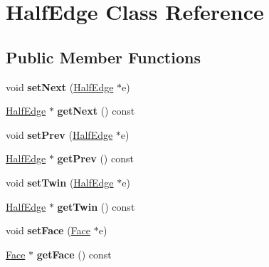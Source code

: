 \hypertarget{class_half_edge}{}\section{Half\+Edge Class Reference}
\label{class_half_edge}
\subsection*{Public Member Functions}
\begin{DoxyCompactItemize}
\item 
\hypertarget{class_half_edge_a7d2060b0e023b7c2d807703698289464}{}void {\bfseries set\+Next} (\hyperlink{class_half_edge}{Half\+Edge} $\ast$e)\label{class_half_edge_a7d2060b0e023b7c2d807703698289464}

\item 
\hypertarget{class_half_edge_a524f79fe9f7de1b472d558ad6d11bbbe}{}\hyperlink{class_half_edge}{Half\+Edge} $\ast$ {\bfseries get\+Next} () const \label{class_half_edge_a524f79fe9f7de1b472d558ad6d11bbbe}

\item 
\hypertarget{class_half_edge_a3ffffd914af607d780afbcad9ef2eb55}{}void {\bfseries set\+Prev} (\hyperlink{class_half_edge}{Half\+Edge} $\ast$e)\label{class_half_edge_a3ffffd914af607d780afbcad9ef2eb55}

\item 
\hypertarget{class_half_edge_a7677b9fc7b34b0e3dfd5bd58531cd239}{}\hyperlink{class_half_edge}{Half\+Edge} $\ast$ {\bfseries get\+Prev} () const \label{class_half_edge_a7677b9fc7b34b0e3dfd5bd58531cd239}

\item 
\hypertarget{class_half_edge_a0ef30e64fa399eb7e5903e254893e4b8}{}void {\bfseries set\+Twin} (\hyperlink{class_half_edge}{Half\+Edge} $\ast$e)\label{class_half_edge_a0ef30e64fa399eb7e5903e254893e4b8}

\item 
\hypertarget{class_half_edge_a9bac3927aa188f1a16f5090b44350092}{}\hyperlink{class_half_edge}{Half\+Edge} $\ast$ {\bfseries get\+Twin} () const \label{class_half_edge_a9bac3927aa188f1a16f5090b44350092}

\item 
\hypertarget{class_half_edge_ab91897093f5781ae02affa4a6fe237ed}{}void {\bfseries set\+Face} (\hyperlink{class_face}{Face} $\ast$e)\label{class_half_edge_ab91897093f5781ae02affa4a6fe237ed}

\item 
\hypertarget{class_half_edge_a866b9e10b29981cba9a149403b414b27}{}\hyperlink{class_face}{Face} $\ast$ {\bfseries get\+Face} () const \label{class_half_edge_a866b9e10b29981cba9a149403b414b27}


\end{DoxyCompactItemize}
